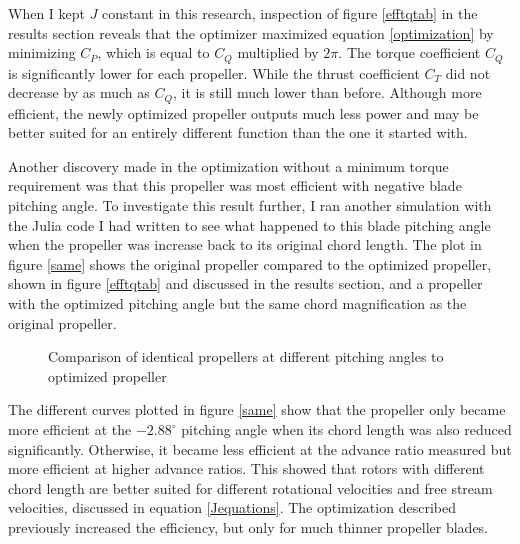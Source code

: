 \documentclass[journal ]{new-aiaa}
\begin{document}
When I kept $J$ constant in this research, inspection of figure \eqref{efftqtab} in the results section reveals that the optimizer maximized equation \eqref{optimization} by minimizing $C_{P}$, which is equal to $C_{Q}$ multiplied by $2 \pi$. The torque coefficient $C_{Q}$ is significantly lower for each propeller. While the thrust coefficient $C_{T}$ did not decrease by as much as $C_{Q}$, it is still much lower than before. Although more efficient, the newly optimized propeller outputs much less power and may be better suited for an entirely different function than the one it started with.

Another discovery made in the optimization without a minimum torque requirement was that this propeller was most efficient with negative blade pitching angle. To investigate this result further, I ran another simulation with the Julia code I had written to see what happened to this blade pitching angle when the propeller was increase back to its original chord length. The plot in figure \eqref{same} shows the original propeller compared to the optimized propeller, shown in figure \eqref{efftqtab} and discussed in the results section, and a propeller with the optimized pitching angle but the same chord magnification as the original propeller. 

\begin{figure}[H]
\centering
	
	\caption{Comparison of identical propellers at different pitching angles to optimized propeller}
	\captionsetup{aboveskip=0pt,font=it}
	\label{same}
\end{figure}

The different curves plotted in figure \eqref{same} show that the propeller only became more efficient at the $-2.88^{\circ}$ pitching angle when its chord length was also reduced significantly. Otherwise, it became less efficient at the advance ratio measured but more efficient at higher advance ratios. This showed that rotors with different chord length are better suited for different rotational velocities and free stream velocities, discussed in equation \eqref{Jequations}. The optimization described previously increased the efficiency, but only for much thinner propeller blades.
\end{document}
